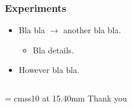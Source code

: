 \begin{frame}\frametitle{Experiments}
  \begin{itemize}
    \item Bla bla $\rightarrow$ another bla bla.
    \begin{itemize}
      \item Bla details.
    \end{itemize}
    \item However bla bla.
  \end{itemize}
\end{frame}


\begin{frame}
  \begin{columns}
  \begin{column}{0.75\textwidth}
  \begin{center}
  \font\endfont = cmss10 at 15.40mm
  \color{DarkBlue}
  \endfont 
  \baselineskip 20.0mm
  Thank you
  \end{center}    
  \end{column}
  \end{columns}
\end{frame} 




